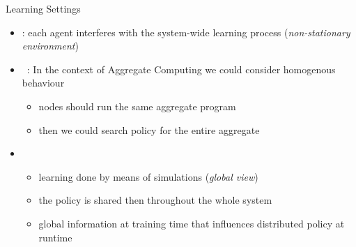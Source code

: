 \documentclass[9pt, aspectratio=169, handout]{beamer}
\begin{document}
\begin{frame}{Learning Settings}
  \begin{cardTiny}
    \begin{itemize}
      \item {}: each agent interferes with the system-wide learning process (\emph{non-stationary environment})
      \item {}~\cite{DBLP:journals/aamas/PanaitL05}: In the context of Aggregate Computing we could consider homogenous behaviour
      \begin{itemize}
        \item nodes should run the same aggregate program
        \item then we could search  policy for the entire aggregate
      \end{itemize}
      \item {}~\cite{DBLP:phd/ethos/Foerster18}
      \begin{itemize}
        \item learning done by means of simulations (\emph{global view})
        \item the policy is shared then throughout the whole system
        \item[\faThumbsUp] global information at training time that influences distributed policy at runtime
      \end{itemize}
    \end{itemize}
  \end{cardTiny}
  \centering
\end{frame}
\end{document}
